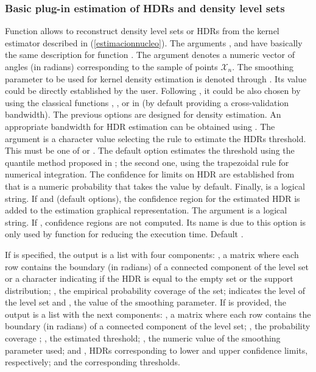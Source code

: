 \subsubsection{Basic plug-in estimation of HDRs and density level sets}
Function  allows to reconstruct density level sets or HDRs from the kernel estimator described in (\ref{estimacionnucleo}). The arguments ,  and  have basically the same description for function . The argument  denotes a numeric vector of angles (in radians) corresponding to the sample of points $\mathcal{X}_n$. The smoothing parameter to be used for kernel density estimation is denoted through . Its value could be directly established by the user. Following \cite{oli2014}, it could be also chosen by using the classical functions , ,  or  in  (by default  providing a cross-validation bandwidth). The previous options are designed for density estimation. An appropriate bandwidth for HDR estimation can be obtained using . The argument  is a character value selecting the rule to estimate the HDRs threshold. This must be one of  or . The default option estimates the threshold using the quantile method proposed in \cite{hyndman1996computing}; the second one, using the trapezoidal rule for numerical integration. The confidence for limits on HDR are established from  that is a numeric probability that takes the value  by default. Finally,  is a logical string. If  and  (default options), the confidence region for the estimated HDR is added to the estimation graphical representation. The argument  is a logical string. If , confidence regions are not computed. Its name is due to this option is only used by function  for reducing the execution time. Default .


If  is specified, the output is a list with four components: , a matrix where each row contains the boundary (in radians) of a connected component of the level set or a character indicating if the HDR is equal to the empty set or the support distribution; , the empirical probability coverage of the set;  indicates the level of the level set and , the value of the smoothing parameter. If  is provided, the output is a list with the next components: , a matrix where each row contains the boundary (in radians) of a connected component of the level set; , the probability coverage ; , the estimated threshold; , the numeric value of the smoothing parameter used;  and , HDRs corresponding to lower and upper confidence limits, respectively;  and  the corresponding thresholds. 

